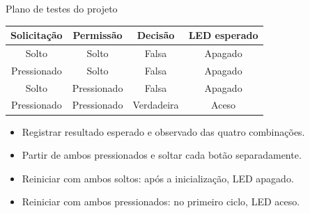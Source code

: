 \begin{frame}[t]{Plano de testes do projeto}
\small
\begin{center}\begin{tabular}{cccc}\toprule
Solicitação & Permissão & Decisão & LED esperado\\\midrule
Solto & Solto & Falsa & Apagado\\
Pressionado & Solto & Falsa & Apagado\\
Solto & Pressionado & Falsa & Apagado\\
Pressionado & Pressionado & Verdadeira & Aceso\\\bottomrule
\end{tabular}\end{center}
\begin{itemize}
\item Registrar resultado esperado e observado das quatro combinações.
\item Partir de ambos pressionados e soltar cada botão separadamente.
\item Reiniciar com ambos soltos: após a inicialização, LED apagado.
\item Reiniciar com ambos pressionados: no primeiro ciclo, LED aceso.
\end{itemize}
\end{frame}
